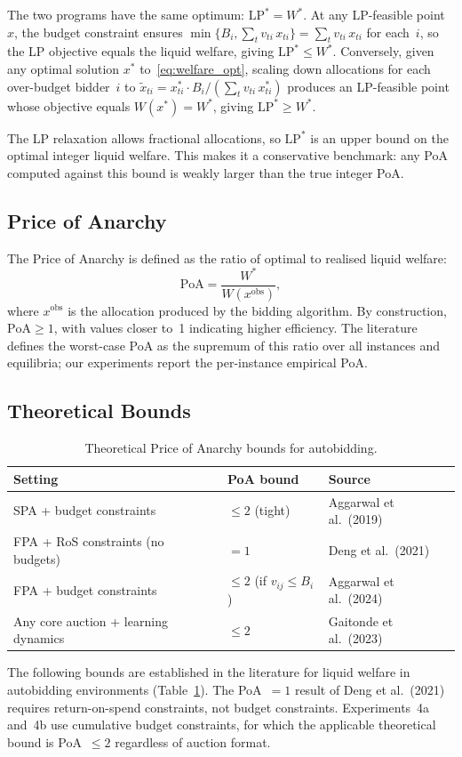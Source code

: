 The two programs have the same optimum: $\mathrm{LP}^* = W^*$. At any LP-feasible point $x$, the budget constraint ensures $\min\{B_i, \sum_t v_{ti}\, x_{ti}\} = \sum_t v_{ti}\, x_{ti}$ for each~$i$, so the LP objective equals the liquid welfare, giving $\mathrm{LP}^* \leq W^*$. Conversely, given any optimal solution $x^*$ to~\eqref{eq:welfare_opt}, scaling down allocations for each over-budget bidder~$i$ to $\tilde{x}_{ti} = x^*_{ti} \cdot B_i / (\sum_t v_{ti}\, x^*_{ti})$ produces an LP-feasible point whose objective equals $W(x^*) = W^*$, giving $\mathrm{LP}^* \geq W^*$.

The LP relaxation allows fractional allocations, so $\mathrm{LP}^*$ is an upper bound on the optimal integer liquid welfare. This makes it a conservative benchmark: any PoA computed against this bound is weakly larger than the true integer PoA.

\subsection{Price of Anarchy}

The Price of Anarchy is defined as the ratio of optimal to realised liquid welfare:
\begin{equation}
  \text{PoA} = \frac{W^*}{W(x^{\text{obs}})},
  \label{eq:poa_def}
\end{equation}
where $x^{\text{obs}}$ is the allocation produced by the bidding algorithm. By construction, $\text{PoA} \geq 1$, with values closer to~1 indicating higher efficiency. The literature defines the worst-case PoA as the supremum of this ratio over all instances and equilibria; our experiments report the per-instance empirical PoA.

\subsection{Theoretical Bounds}

\begin{table}[H]
\centering
\small
\caption{Theoretical Price of Anarchy bounds for autobidding.}
\label{tab:poa_bounds}
\begin{tabular}{lll}
\toprule
\textbf{Setting} & \textbf{PoA bound} & \textbf{Source} \\
\midrule
SPA + budget constraints & $\leq 2$ (tight) & Aggarwal et al.\ (2019) \\
FPA + RoS constraints (no budgets) & $= 1$ & Deng et al.\ (2021) \\
FPA + budget constraints & $\leq 2$ (if $v_{ij} \leq B_i$) & Aggarwal et al.\ (2024) \\
Any core auction + learning dynamics & $\leq 2$ & Gaitonde et al.\ (2023) \\
\bottomrule
\end{tabular}
\end{table}

The following bounds are established in the literature for liquid welfare in autobidding environments (Table~\ref{tab:poa_bounds}). The PoA~$= 1$ result of Deng et al.\ (2021) requires return-on-spend constraints, not budget constraints. Experiments~4a and~4b use cumulative budget constraints, for which the applicable theoretical bound is PoA~$\leq 2$ regardless of auction format.
